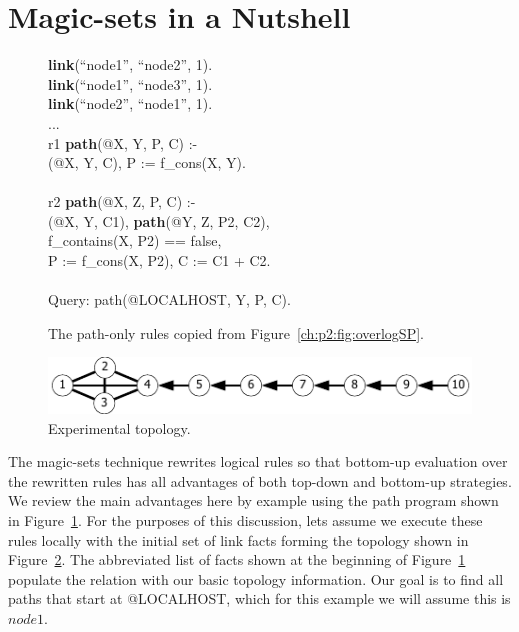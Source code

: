 \section{Magic-sets in a Nutshell}
\label{ch:magic:sec:review}

\begin{figure}[!t]
\ssp
\centering
\begin{boxedminipage}{\linewidth}
{\bf link}(``node1'', ``node2'', 1).\\
{\bf link}(``node1'', ``node3'', 1).\\
{\bf link}(``node2'', ``node1'', 1).\\
...\\
r1 {\bf path}(@X, Y, P, C) :- \\
(@X, Y, C), P := f\_cons(X, Y). \\
\\
r2 {\bf path}(@X, Z, P, C) :- \\
(@X, Y, C1), {\bf path}(@Y, Z, P2, C2),\\
\datalogspace f\_contains(X, P2) == false, \\
\datalogspace P := f\_cons(X, P2), C := C1 + C2. \\
\\
Query: path(@LOCALHOST, Y, P, C).
\end{boxedminipage}
\caption{\label{ch:magic:fig:basicSP}The path-only rules copied from Figure~\ref{ch:p2:fig:overlogSP}.}
\end{figure}

\begin{figure}
\centering
\includegraphics[scale=1.2]{figures/Topology}
\caption{Experimental topology.}
\label{ch:evita:fig:topo}
\end{figure}

The magic-sets technique rewrites logical rules so that bottom-up evaluation
over the rewritten rules has all advantages of both top-down and bottom-up
strategies.  We review the main advantages here by example using the path
program shown in Figure~\ref{ch:magic:fig:basicSP}.  For the purposes of this
discussion, lets assume we execute these rules locally with the initial set of
link facts forming the topology shown in Figure~\ref{ch:evita:fig:topo}.  The
abbreviated list of facts shown at the beginning of
Figure~\ref{ch:magic:fig:basicSP} populate the  relation with our
basic topology information.  Our goal is to find all paths that start at
@LOCALHOST, which for this example we will assume this is $node1$.

